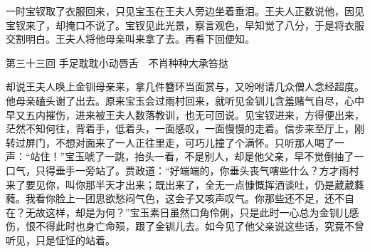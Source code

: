 \documentclass[12pt,oneside]{book}
\begin{document}
一时宝钗取了衣服回来，只见宝玉在王夫人旁边坐着垂泪。王夫人正数说他，因见宝钗来了，却掩口不说了。宝钗见此光景，察言观色，早知觉了八分，于是将衣服交割明白。王夫人将他母亲叫来拿了去。再看下回便知。
 
第三十三回  手足耽耽小动唇舌　不肖种种大承笞挞


却说王夫人唤上金钏母亲来，拿几件簪环当面赏与，又吩咐请几众僧人念经超度。他母亲磕头谢了出去。原来宝玉会过雨村回来，就听见金钏儿含羞赌气自尽，心中早又五内摧伤，进来被王夫人数落教训，也无可回说。见宝钗进来，方得便出来，茫然不知何往，背着手，低着头，一面感叹，一面慢慢的走着。信步来至厅上，刚转过屏门，不想对面来了一人正往里走，可巧儿撞了个满怀。只听那人喝了一声：“站住！”宝玉唬了一跳，抬头一看，不是别人，却是他父亲，早不觉倒抽了一口气，只得垂手一旁站了。贾政道：“好端端的，你垂头丧气嗐些什么？方才雨村来了要见你，叫你那半天才出来；既出来了，全无一点慷慨挥洒谈吐，仍是葳葳蕤蕤。我看你脸上一团思欲愁闷气色，这会子又咳声叹气。你那些还不足，还不自在？无故这样，却是为何？”宝玉素日虽然口角伶俐，只是此时一心总为金钏儿感伤，恨不得此时也身亡命殒，跟了金钏儿去。如今见了他父亲说这些话，究竟不曾听见，只是怔怔的站着。
\end{document}
